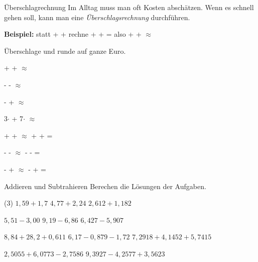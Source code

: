 \documentclass[12pt,a5paper,landscape]{scrartcl}
\begin{document}
	
	\begin{karte1}{Überschlagrechnung}
	Im Alltag muss man oft Kosten abschätzen. Wenn es schnell gehen soll, kann man eine \emph{Überschlagsrechnung} durchführen.

	\smallskip
	\textbf{Beispiel:} statt  +  +  rechne  +  +  =  also  +  +  $\approx$ 

	\smallskip
	Überschlage und runde auf ganze Euro.
	\begin{enumeratea}
		\item {} +  +  $\approx$ \linie[1cm]
		\item {} -  -  $\approx$ \linie[1cm]
		\item {} -  +  $\approx$ \linie[1cm]
		\item 3$\cdot$  + 7$\cdot$  $\approx$ \linie[1cm]
	\end{enumeratea}
	\end{karte1}
	
	\begin{loesungskarte}
	\begin{enumeratea}
		\item {} +  +  $\approx$  +  +  = \EUR{25}
		\item {} -  -  $\approx$  -  -  = \EUR{6}
		\item {} -  +  $\approx$  -  +  = \EUR{19}
	\end{enumeratea}
	\end{loesungskarte}
	
	\begin{karte1}{Addieren und Subtrahieren}
		Berechen die Lösungen der Aufgaben.
		
		\begin{tasks}(3)
			\task $1,59 + 1,7$
			\task $4,77 + 2,24$
			\task $2,612 + 1,182$
			
			\task $5,51 - 3,00$
			\task $9,19 - 6,86$
			\task $6,427 - 5,907$
			
			\task $8,84 + 28,2 + 0,611$
			\task $6,17 - 0,879 - 1,72$
			\task $7,2918 + 4,1452 + 5,7415$
			
			\task $2,5055 + 6,0773 - 2,7586$
			\task $9,3927 - 4,2577 + 3,5623$
		\end{tasks}
	\end{karte1}
	
\end{document}
